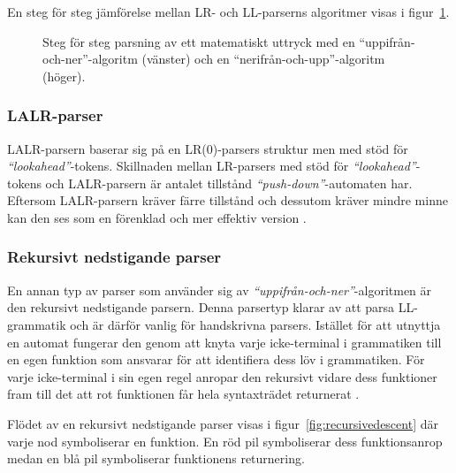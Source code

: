 En steg för steg jämförelse mellan LR- och LL-parserns algoritmer visas i
figur~\ref{fig:ll-vs-lr}.

\begin{figure}[ht]
  \begin{minipage}[t]{0.5\textwidth}
    
  \end{minipage}%
  \begin{minipage}[t]{0.5\textwidth}
    
  \end{minipage}%
  \caption{Steg för steg parsning av ett matematiskt uttryck med en
    ``uppifrån-och-ner''-algoritm (vänster) och en
    ``nerifrån-och-upp''-algoritm (höger).}
  \label{fig:ll-vs-lr}
\end{figure}

\subsubsection{LALR-parser}

LALR-parsern baserar sig på en LR(0)-parsers struktur men med stöd för
\textit{``lookahead''}-tokens. Skillnaden mellan LR-parsers med stöd för
\textit{``lookahead''}-tokens och LALR-parsern är antalet tillstånd
\textit{``push-down''}-automaten har.  Eftersom LALR-parsern kräver färre
tillstånd och dessutom kräver mindre minne kan den ses som en förenklad och
mer effektiv version \citep[s. 266]{aa06}.

\subsubsection{Rekursivt nedstigande parser}

En annan typ av parser som använder sig av
\textit{``uppifrån-och-ner''}-algoritmen är den rekursivt nedstigande parsern.
Denna parsertyp klarar av att parsa LL-grammatik och är därför vanlig för
handskrivna parsers. Istället för att utnyttja en automat fungerar den genom
att knyta varje icke-terminal i grammatiken till en egen funktion som ansvarar
för att identifiera dess löv i grammatiken. För varje icke-terminal i sin egen
regel anropar den rekursivt vidare dess funktioner fram till det att rot
funktionen får hela syntaxträdet returnerat \citep[s. 24]{pt10}.

Flödet av en rekursivt nedstigande parser visas i
figur~\ref{fig:recursivedescent} där varje nod symboliserar en funktion.
En röd pil symboliserar dess funktionsanrop medan en blå pil symboliserar
funktionens returnering.

